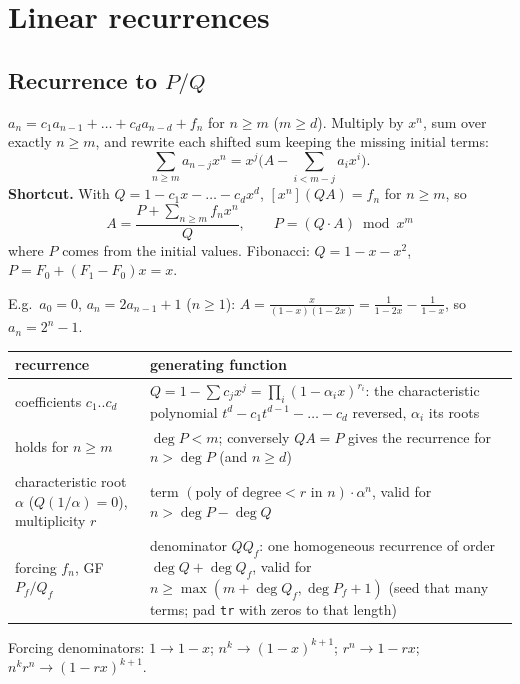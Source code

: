 \section{Linear recurrences}
	\subsection{Recurrence to $P/Q$}
	$a_n=c_1a_{n-1}+\dots+c_da_{n-d}+f_n$ for $n\ge m$ ($m\ge d$). Multiply by $x^n$, sum over exactly $n\ge m$, and rewrite each shifted sum keeping the missing initial terms:
	\[\textstyle\sum_{n\ge m}a_{n-j}x^n=x^j\big(A-\sum_{i<m-j}a_ix^i\big).\]
	\textbf{Shortcut.} With $Q=1-c_1x-\dots-c_dx^d$, $[x^n](QA)=f_n$ for $n\ge m$, so
	\[A=\frac{P+\sum_{n\ge m}f_nx^n}{Q},\qquad P=(Q\cdot A)\bmod x^m\]
	where $P$ comes from the initial values.
	Fibonacci: $Q=1-x-x^2$, $P=F_0+(F_1-F_0)x=x$.

	E.g.\ $a_0=0$, $a_n=2a_{n-1}+1$ ($n\ge1$): $A=\frac{x}{(1-x)(1-2x)}=\frac1{1-2x}-\frac1{1-x}$, so $a_n=2^n-1$.
	\begin{center}\small\renewcommand{\arraystretch}{1.3}
	\begin{tabular}{@{}L{2.9cm}@{\ \ }L{5.75cm}@{}}
	recurrence & generating function \\ \hline
	coefficients $c_1..c_d$ & $Q=1-\sum c_jx^j=\prod_i(1-\alpha_ix)^{r_i}$: the characteristic polynomial $t^d-c_1t^{d-1}-\dots-c_d$ reversed, $\alpha_i$ its roots \\
	holds for $n\ge m$ & $\deg P<m$; conversely $QA=P$ gives the recurrence for $n>\deg P$ (and $n\ge d$) \\
	characteristic root $\alpha$ ($Q(1/\alpha)=0$), multiplicity $r$ & term $(\text{poly of degree}<r\text{ in }n)\cdot\alpha^n$, valid for $n>\deg P-\deg Q$ \\
	forcing $f_n$, GF $P_f/Q_f$ & denominator $QQ_f$: one homogeneous recurrence of order $\deg Q+\deg Q_f$, valid for $n\ge\max(m+\deg Q_f,\deg P_f+1)$ (seed that many terms; pad \texttt{tr} with zeros to that length) \\
	\end{tabular}
	\end{center}
	Forcing denominators: $1\to1-x$; $n^k\to(1-x)^{k+1}$; $r^n\to1-rx$; $n^kr^n\to(1-rx)^{k+1}$.

